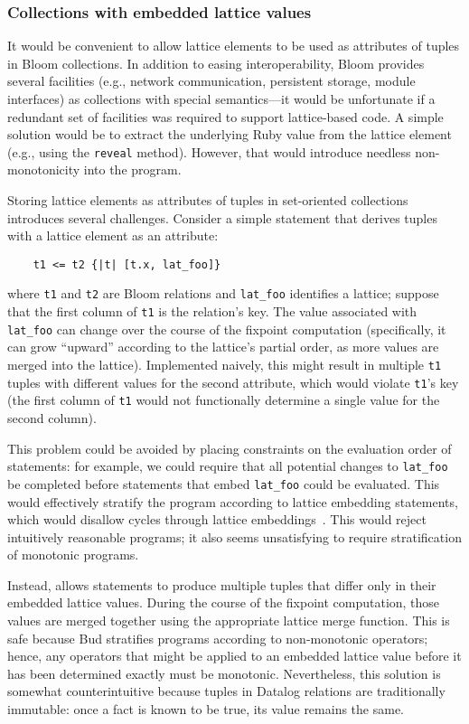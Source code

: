 \subsubsection{Collections with embedded lattice values}
\label{sec:lattice-embedding}

It would be convenient to allow lattice elements to be used as attributes of
tuples in Bloom collections. In addition to easing interoperability, Bloom
provides several facilities (e.g., network communication, persistent storage,
module interfaces) as collections with special semantics---it would be
unfortunate if a redundant set of facilities was required to support
lattice-based code. A simple solution would be to extract the underlying Ruby
value from the lattice element (e.g., using the \texttt{reveal} method).
However, that would introduce needless non-monotonicity into the program.

Storing lattice elements as attributes of tuples in set-oriented collections
introduces several challenges. Consider a simple \lang statement that derives
tuples with a lattice element as an attribute:
\begin{verbatim}
    t1 <= t2 {|t| [t.x, lat_foo]}
\end{verbatim}
where \texttt{t1} and \texttt{t2} are Bloom relations and \texttt{lat\_foo}
identifies a lattice; suppose that the first column of \texttt{t1} is the
relation's key. The value associated with \texttt{lat\_foo} can change over the
course of the fixpoint computation (specifically, it can grow ``upward''
according to the lattice's partial order, as more values are merged into the
lattice). Implemented naively, this might result in multiple \texttt{t1} tuples
with different values for the second attribute, which would violate
\texttt{t1}'s key (the first column of \texttt{t1} would not functionally
determine a single value for the second column).

This problem could be avoided by placing constraints on the evaluation order of
statements: for example, we could require that all potential changes to
\texttt{lat\_foo} be completed before statements that embed \texttt{lat\_foo}
could be evaluated. This would effectively stratify the program according to
lattice embedding statements, which would disallow cycles through lattice
embeddings~\cite{Apt1988}. This would reject intuitively reasonable programs; it
also seems unsatisfying to require stratification of monotonic programs.

Instead, \lang allows statements to produce multiple tuples that differ only in
their embedded lattice values. During the course of the fixpoint computation,
those values are merged together using the appropriate lattice merge
function. This is safe because Bud stratifies programs according to
non-monotonic operators; hence, any operators that might be applied to an
embedded lattice value before it has been determined exactly must be
monotonic. Nevertheless, this solution is somewhat counterintuitive because
tuples in Datalog relations are traditionally immutable: once a fact is known to
be true, its value remains the same.

